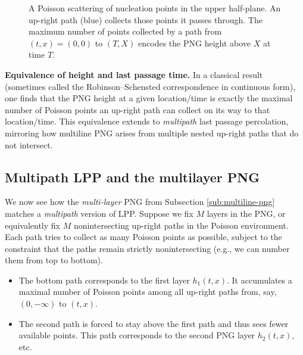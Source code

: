 \documentclass[letterpaper,11pt,oneside,reqno]{article}
\numberwithin{equation}{section}
\theoremstyle{definition}
\begin{document}
\begin{figure}[htpb]
\centering
{}
\caption{A Poisson scattering of nucleation points in the upper half-plane. An up-right path (blue) collects those points it passes through. The maximum number of points collected by a path from $(t,x)=(0,0)$ to $(T,X)$ encodes the PNG height above $X$ at time $T$.}
\label{fig:png-lpp-map}
\end{figure}

\smallskip

\noindent\textbf{Equivalence of height and last passage time.} In a classical result (sometimes called the Robinson--Schensted correspondence in continuous form), one finds that the PNG height at a given location/time is exactly the maximal number of Poisson points an up-right path can collect on its way to that location/time. This equivalence extends to \emph{multipath} last passage percolation, mirroring how multiline PNG arises from multiple nested up-right paths that do not intersect.

\subsection{Multipath LPP and the multilayer PNG}
\label{sub:multi-lpp-multi-png}
We now see how the \emph{multi-layer} PNG from Subsection \ref{sub:multiline-png} matches a \emph{multipath} version of LPP. Suppose we fix $M$ layers in the PNG, or equivalently fix $M$ nonintersecting up-right paths in the Poisson environment. Each path tries to collect as many Poisson points as possible, subject to the constraint that the paths remain strictly nonintersecting (e.g., we can number them from top to bottom).

\begin{itemize}
\item The bottom path corresponds to the first layer $h_1(t,x)$. It accumulates a maximal number of Poisson points among all up-right paths from, say, $(0,-\infty)$ to $(t,x)$.
\item The second path is forced to stay above the first path and thus sees fewer available points. This path corresponds to the second PNG layer $h_2(t,x)$, etc.
\end{itemize}
\end{document}
